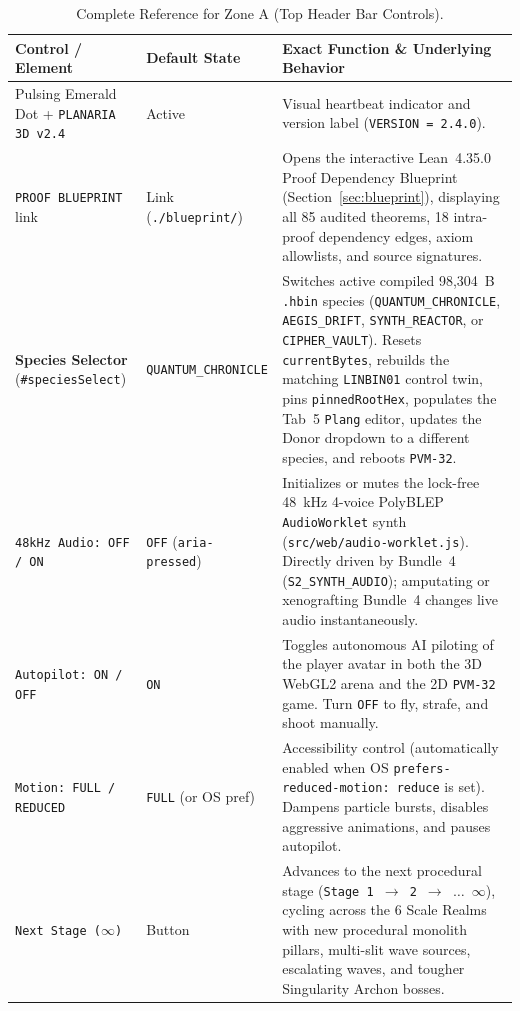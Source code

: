\documentclass[10pt,letterpaper]{article}
\begin{document}
\begin{table}[ht]
\centering
\caption{Complete Reference for Zone A (Top Header Bar Controls).}
\label{tab:zone-a}
\footnotesize
\begin{tabularx}{\textwidth}{@{} L{3.3cm} L{2.8cm} Y @{}}
\toprule
\textbf{Control / Element} & \textbf{Default State} & \textbf{Exact Function \& Underlying Behavior} \\
\midrule
Pulsing Emerald Dot + \texttt{PLANARIA 3D v2.4} & Active & Visual heartbeat indicator and version label (\texttt{VERSION = 2.4.0}). \\
\texttt{PROOF BLUEPRINT} link & Link (\texttt{./blueprint/}) & Opens the interactive Lean~4.35.0 Proof Dependency Blueprint (Section~\ref{sec:blueprint}), displaying all 85 audited theorems, 18 intra-proof dependency edges, axiom allowlists, and source signatures. \\
\textbf{Species Selector} (\texttt{\#speciesSelect}) & \texttt{QUANTUM\_CHRONICLE} & Switches active compiled 98,304~B \texttt{.hbin} species (\texttt{QUANTUM\_CHRONICLE}, \texttt{AEGIS\_DRIFT}, \texttt{SYNTH\_REACTOR}, or \texttt{CIPHER\_VAULT}). Resets \texttt{currentBytes}, rebuilds the matching \texttt{LINBIN01} control twin, pins \texttt{pinnedRootHex}, populates the Tab~5 \texttt{Plang} editor, updates the Donor dropdown to a different species, and reboots \texttt{PVM-32}. \\
\texttt{48kHz Audio: OFF / ON} & \texttt{OFF} (\texttt{aria-pressed}) & Initializes or mutes the lock-free 48~kHz 4-voice PolyBLEP \texttt{AudioWorklet} synth (\texttt{src/web/audio-worklet.js}). Directly driven by Bundle~4 (\texttt{S2\_SYNTH\_AUDIO}); amputating or xenografting Bundle~4 changes live audio instantaneously. \\
\texttt{Autopilot: ON / OFF} & \texttt{ON} & Toggles autonomous AI piloting of the player avatar in both the 3D WebGL2 arena and the 2D \texttt{PVM-32} game. Turn \texttt{OFF} to fly, strafe, and shoot manually. \\
\texttt{Motion: FULL / REDUCED} & \texttt{FULL} (or OS pref) & Accessibility control (automatically enabled when OS \texttt{prefers-reduced-motion: reduce} is set). Dampens particle bursts, disables aggressive animations, and pauses autopilot. \\
\texttt{Next Stage ($\infty$)} & Button & Advances to the next procedural stage (\texttt{Stage 1 $\to$ 2 $\to$ $\dots$ $\infty$}), cycling across the 6 Scale Realms with new procedural monolith pillars, multi-slit wave sources, escalating waves, and tougher Singularity Archon bosses. \\

\end{tabularx}
\end{table}
\end{document}
